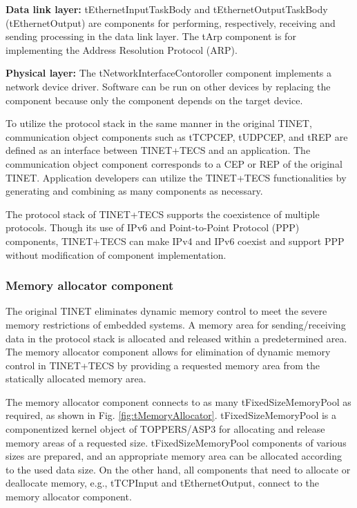 \documentclass[conference]{IEEEtran/IEEEtran}
\begin{document}
{\bf Data link layer:}
tEthernetInputTaskBody and tEthernetOutputTaskBody (tEthernetOutput) are components for performing, respectively, receiving and sending processing in the data link layer.
The tArp component is for implementing the Address Resolution Protocol (ARP).

{\bf Physical layer:}
The tNetworkInterfaceContoroller component implements a network device driver.
Software can be run on other devices by replacing the component because only the component depends on the target device.

To utilize the protocol stack in the same manner in the original TINET, communication object components such as tTCPCEP, tUDPCEP, and tREP are defined as an interface between TINET+TECS and an application.
The communication object component corresponds to a CEP or REP of the original TINET.
Application developers can utilize the TINET+TECS functionalities by generating and combining as many components as necessary.

The protocol stack of TINET+TECS supports the coexistence of multiple protocols.
Though its use of IPv6 and Point-to-Point Protocol (PPP) components, TINET+TECS can make IPv4 and IPv6 coexist and support PPP without modification of component implementation.

\subsubsection{Memory allocator component} 

The original TINET eliminates dynamic memory control to meet the severe memory restrictions of embedded systems.
A memory area for sending/receiving data in the protocol stack is allocated and released within a predetermined area.
The memory allocator component allows for elimination of dynamic memory control in TINET+TECS by providing a requested memory area from the statically allocated memory area.

The memory allocator component connects to as many tFixedSizeMemoryPool as required, as shown in Fig. \ref{fig:tMemoryAllocator}.
tFixedSizeMemoryPool is a componentized kernel object of TOPPERS/ASP3 for allocating and release memory areas of a requested size. 
tFixedSizeMemoryPool components of various sizes are prepared, and an appropriate memory area can be allocated according to the used data size.
On the other hand, all components that need to allocate or deallocate memory, e.g., tTCPInput and tEthernetOutput, connect to the memory allocator component.
\end{document}
